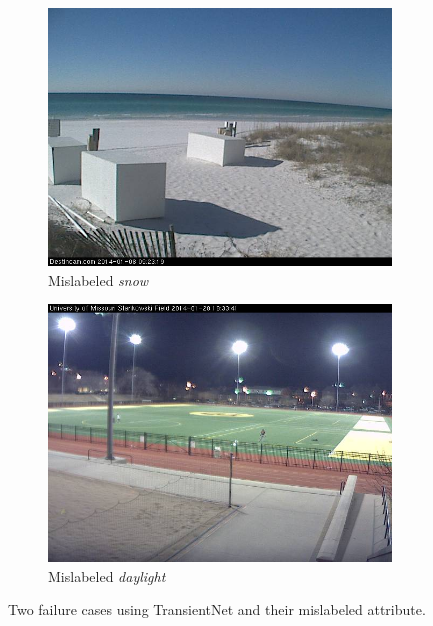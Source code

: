 \documentclass[10pt,twocolumn,letterpaper]{article}
\begin{document}
\begin{figure}
	\centering
  \begin{subfigure}[b]{0.49\columnwidth}
    \centering
		\includegraphics[width=\columnwidth]{figs/ex_bad_ims/snow_bad_1.jpg}
    \caption{Mislabeled \emph{snow}}
    \label{fig:ex_bad_snow}
	\end{subfigure}	
  \begin{subfigure}[b]{0.49\columnwidth}
    \centering
		\includegraphics[width=\columnwidth]{figs/ex_bad_ims/daylight_bad_1.jpg}
    \caption{Mislabeled \emph{daylight}}
    \label{fig:ex_bad_daylight}
	\end{subfigure}	
	\caption{Two failure cases using TransientNet and their mislabeled attribute.}
	\label{fig:ex_bad_transientnet}
\end{figure}
\end{document}
